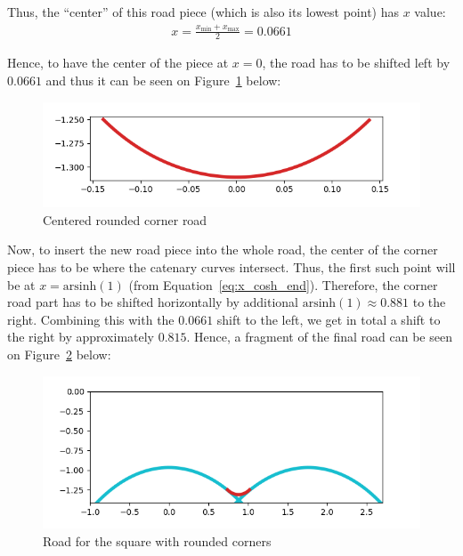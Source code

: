 \documentclass[12pt]{article}
\begin{document}
        Thus, the ``center'' of this road piece (which is also its lowest point) has $x$ value:
        \begin{align}
            x = \frac{x_{\text{min}}+x_{\text{max}}}{2} = 0.0661
        \end{align}

        Hence, to have the center of the piece at $x=0$, the road has to be shifted left by $0.0661$ and thus it can be seen on Figure~\ref{fig:corner_road_centered} below:
        \begin{figure}[H]
            \includegraphics[width=\linewidth]{images/centered_corner_road.png}
            \caption{Centered rounded corner road}\label{fig:corner_road_centered}
        \end{figure}

        Now, to insert the new road piece into the whole road, the center of the corner piece has to be where the catenary curves intersect. Thus, the first such point will be at $x=\text{arsinh}(1)$ (from Equation~\ref{eq:x_cosh_end}). Therefore, the corner road part has to be shifted horizontally by additional $\text{arsinh}(1) \approx 0.881$ to the right. Combining this with the $0.0661$ shift to the left, we get in total a shift to the right by approximately $0.815$. Hence, a fragment of the final road can be seen on Figure~\ref{fig:corner_road_full} below: 
        \begin{figure}[H]
            \includegraphics[width=\linewidth]{images/road_with_corner.png}
            \caption{Road for the square with rounded corners}\label{fig:corner_road_full}
        \end{figure}
\end{document}
